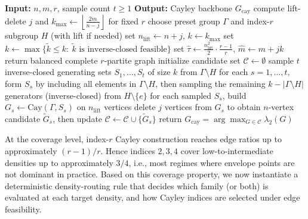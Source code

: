 \documentclass[letterpaper, 10 pt, conference]{ieeeconf}  %
\newcommand{\1}{\mathbf{1}}
\newcommand{\0}{\mathbf{0}}
\begin{document}
\begin{algorithm}[t]
\caption{Index-\(r\) Cayley Backbone Construction}
\label{alg:cayley_backbone}
\begin{algorithmic}[1]
\State \textbf{Input:} \(n,m,r\), sample count \(t\ge 1\)
\State \textbf{Output:} Cayley backbone \(G_{\mathrm{cay}}\)
\State compute lift-delete \(j\) and \(k_{\max}\leftarrow\left\lfloor\frac{2m}{n-j}\right\rfloor\) for fixed \(r\)
\State choose preset group \(\Gamma\) and index-\(r\) subgroup \(H\) (with lift if needed)
\State set \(n_{\mathrm{lift}}\leftarrow n+j\), \(k\leftarrow k_{\max}\)
\State set \(k\leftarrow \max\{\tilde{k}\le k:\ \tilde{k}\text{ is inverse-closed feasible}\}\)
\EndIf
\State set \(\widehat{\tau}\leftarrow \frac{n_{\mathrm{lift}}^2}{2}\cdot\frac{r-1}{r}\), \(\widehat{m}\leftarrow m+jk\)
\State return balanced complete \(r\)-partite graph
\EndIf
\State initialize candidate set \(\mathcal{C}\leftarrow\emptyset\)
\State sample \(t\) inverse-closed generating sets \(S_1,\ldots,S_t\) of size \(k\) from \(\Gamma\setminus H\)
\Else
\State for each \(s=1,\ldots,t\), form \(S_s\) by including all elements in \(\Gamma\setminus H\), then sampling the remaining \(k-\lvert\Gamma\setminus H\rvert\) generators (inverse-closed) from \(H\setminus\{e\}\)
\EndIf
\State for each sampled \(S_s\), build \(G_s\leftarrow \mathrm{Cay}(\Gamma,S_s)\) on \(n_{\mathrm{lift}}\) vertices
\State delete \(j\) vertices from \(G_s\) to obtain \(n\)-vertex candidate \(\widetilde{G}_s\), then update \(\mathcal{C}\leftarrow \mathcal{C}\cup\{\widetilde{G}_s\}\)
\State return \(G_{\mathrm{cay}}=\arg\max_{G\in\mathcal{C}}\lambda_2(G)\)
\end{algorithmic}
\end{algorithm}

At the coverage level, index-\(r\) Cayley construction reaches edge ratios up to approximately \((r-1)/r\). Hence indices \(2,3,4\) cover low-to-intermediate densities up to approximately \(3/4\), i.e., most regimes where envelope points are not dominant in practice.
Based on this coverage property, we now instantiate a deterministic density-routing rule that decides which family (or both) is evaluated at each target density, and how Cayley indices are selected under edge feasibility.
\end{document}
